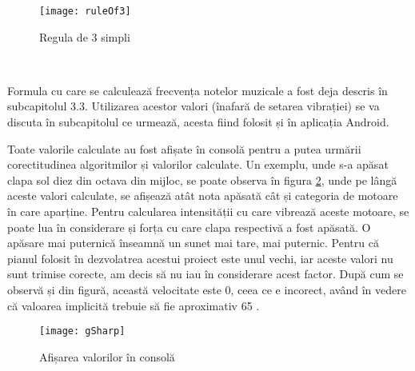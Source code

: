 \documentclass[../IoMusT.tex]{subfiles}
\begin{document}
\begin{figure}[h]
\centering
\texttt{[image: ruleOf3]}
\caption{Regula de 3 simpli}
\label{fig:ruleOf3}
\end{figure}  
\\
\par Formula cu care se calculează frecvența notelor muzicale a fost deja descris în subcapitolul 3.3. Utilizarea acestor valori (înafară de setarea vibrației) se va discuta în subcapitolul ce urmează, acesta fiind folosit și în aplicația Android.
\\
\par Toate valorile calculate au fost afișate în consolă pentru a putea urmării corectitudinea algoritmilor și valorilor calculate. Un exemplu, unde s-a apăsat clapa sol diez din octava din mijloc, se poate observa în figura \ref{fig:gSharp}, unde pe lângă aceste valori calculate, se afișează atât nota apăsată cât și categoria de motoare în care aparține. Pentru calcularea intensității cu care vibrează aceste motoare, se poate lua în considerare și forța cu care clapa respectivă a fost apăsată. O apăsare mai puternică înseamnă un sunet mai tare, mai puternic. Pentru că pianul folosit în dezvolatrea acestui proiect este unul vechi, iar aceste valori nu sunt trimise corecte, am decis să nu iau în considerare acest factor. După cum se observă și din figură, această velocitate este 0, ceea ce e incorect, având în vedere că valoarea implicită trebuie să fie aproximativ 65 \cite{Mido}.
\begin{figure}[h]
\centering
\texttt{[image: gSharp]}
\caption{Afișarea valorilor în consolă}
\label{fig:gSharp}
\end{figure}  
\end{document}
